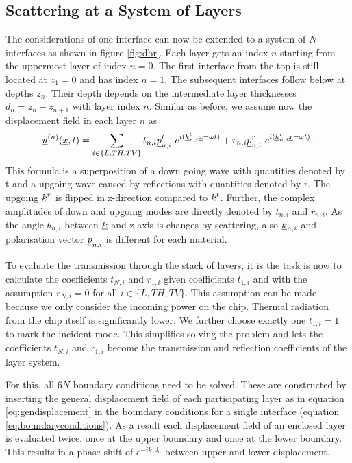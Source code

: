 \subsection{Scattering at a System of Layers}
The considerations of one interface can now be extended to a system of $N$
interfaces as shown in figure \ref{fig:dbr}. Each layer gets an index $n$
starting from the uppermost layer of index $n=0$. The first interface from the
top is still located at $z_1=0$ and has index $n=1$. The subsequent interfaces
follow below at depths $z_n$. Their depth depends on the intermediate layer
thicknesses $d_n=z_n-z_{n+1}$ with layer index $n$.
Similar as before, we assume now the displacement field in each layer $n$ as
\begin{equation} \label{eq:gendisplacement}
    \underline{u}^{(n)}(\underline{x},t)= \sum\limits_{i\in\{L,TH,TV\}} t_{n,i}
    \underline{p}_{n,i}^t\ e^{i(\underline{k}_{n,i}^t\underline{x} - \omega t)}
    + r_{n,i} \underline{p}_{n,i}^r\ e^{i(\underline{k}_{n,i}^r\underline{x} - \omega t)}.
\end{equation} %
This formula is a superposition of a down going wave with quantities denoted by
t and a upgoing wave caused by reflections with quantities denoted by r. The
upgoing $\underline{k}^r$ is flipped in z-direction compared to $\underline{k}^t$.
Further, the complex amplitudes of down and upgoing modes are directly denoted
by $t_{n,i}$ and $r_{n,i}$. As
the angle $\theta_{n,i}$ between $\underline{k}$ and z-axis is changes by
scattering, also $\underline{k}_{n,i}$ and polarisation vector $\underline{p}_{n,i}$ is
different for each material. %

To evaluate the transmission through the stack of layers, it is the task is now
to calculate the coefficients $t_{N,i}$ and $r_{1,i}$ given coefficients
$t_{1,i}$ and with the assumption $r_{N,i}=0$ for all $i\in\{L,TH,TV\}$.
This assumption can be made because we only consider the incoming power on the
chip. Thermal radiation from the chip itself is significantly lower. We
further choose exactly one $t_{1,i}=1$ to mark the incident mode. This
simplifies solving the problem and lets the coefficients $t_{N,i}$ and
$r_{1,i}$ become the transmission and reflection coefficients of the layer
system.

For this, all $6N$ boundary conditions need to be solved. These are constructed
by inserting the general displacement field of each participating layer as in
equation \ref{eq:gendisplacement} in the boundary conditions for a single
interface (equation \ref{eq:boundaryconditions}). As a result each displacement
field of an enclosed layer is evaluated twice, once at the upper boundary and
once at the lower boundary. This results in a phase shift of $e^{-ik_zd_n}$
between upper and lower displacement.

